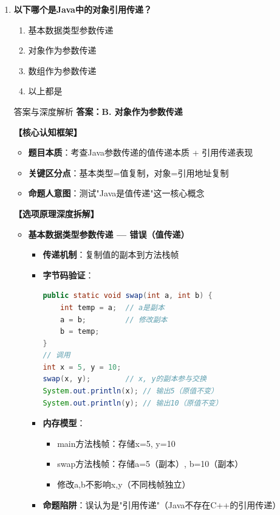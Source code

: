 \documentclass[12pt, a4paper]{ctexart}
\begin{document}
\begin{enumerate}[label=\textbf{\arabic*.}]
	\item \textbf{以下哪个是Java中的对象引用传递？}
	      \begin{enumerate}[label=\Alph*.]
		      \item 基本数据类型参数传递
		      \item 对象作为参数传递
		      \item 数组作为参数传递
		      \item 以上都是
	      \end{enumerate}

	      \begin{bluebox}{答案与深度解析}
		      \textbf{答案：B. 对象作为参数传递}

		      \textbf{【核心认知框架】}
		      \begin{itemize}[label={}, leftmargin=*, nosep]
			      \item \textbf{题目本质}：考查Java参数传递的值传递本质 + 引用传递表现
			      \item \textbf{关键区分点}：基本类型=值复制，对象=引用地址复制
			      \item \textbf{命题人意图}：测试"Java是值传递"这一核心概念
		      \end{itemize}

		      \textbf{【选项原理深度拆解】}

		      \begin{itemize}[leftmargin=*, nosep, label={}]
			      \item[A] \textbf{基本数据类型参数传递 — 错误（值传递）}
			            \begin{itemize}[label={}, leftmargin=*, nosep]
				            \item \textbf{传递机制}：复制值的副本到方法栈帧
				            \item \textbf{字节码验证}：
				                  \begin{lstlisting}[language=Java]
public static void swap(int a, int b) {
    int temp = a;  // a是副本
    a = b;         // 修改副本
    b = temp;
}
// 调用
int x = 5, y = 10;
swap(x, y);        // x, y的副本参与交换
System.out.println(x); // 输出5（原值不变）
System.out.println(y); // 输出10（原值不变）
				            \end{lstlisting}
				            \item \textbf{内存模型}：
				                  \begin{itemize}[label={}, nosep]
					                  \item main方法栈帧：存储x=5, y=10
					                  \item swap方法栈帧：存储a=5（副本）, b=10（副本）
					                  \item 修改a,b不影响x,y（不同栈帧独立）
				                  \end{itemize}
				            \item \textbf{命题陷阱}：误认为是"引用传递"（Java不存在C++的引用传递）
			            \end{itemize}


\end{itemize}
\end{bluebox}
\end{enumerate}
\end{document}
